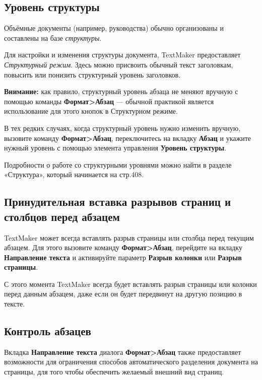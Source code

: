 \documentclass[a4paper,10pt]{article}
\begin{document}
\subsection{Уровень структуры}
Объёмные документы (например, руководства) обычно организованы и составлены на базе \textit{структуры}.

Для настройки и изменения структуры документа, TextMaker предоставляет \textit{Структурный режим}. Здесь можно присвоить обычный текст заголовкам, повысить или понизить структурный уровень заголовков.

\begin{mdframed}[backgroundcolor=blue!10]
\textbf{Внимание:} как правило, структурный уровень абзаца не меняют вручную с помощью команды \textbf{Формат>Абзац} --- обычной практикой является использование для этого кнопок в Структурном режиме.
\end{mdframed}

В тех редких случаях, когда структурный уровень нужно изменить вручную, вызовите команду \textbf{Формат>Абзац}, переключитесь на вкладку \textbf{Абзац} и укажите нужный уровень с помощью элемента управления \textbf{Уровень структуры}.

Подробности о работе со структурными уровнями можно найти в разделе «Структура», который начинается на стр.408.

\subsection{Принудительная вставка разрывов страниц и столбцов перед абзацем}
TextMaker может всегда вставлять разрыв страницы или столбца перед текущим абзацем. Для этого вызовите команду \textbf{Формат>Абзац}, перейдите на вкладку  \textbf{Направление текста} и активируйте параметр \textbf{Разрыв колонки} или \textbf{Разрыв страницы}.

С этого момента TextMaker всегда будет вставлять разрыв страницы или колонки перед данным абзацем, даже если он будет передвинут на другую позицию в тексте.

\subsection{Контроль абзацев}
Вкладка \textbf{Направление текста} диалога \textbf{Формат>Абзац} также предоставляет возможности для ограничения способов автоматического разделения документа на страницы, для того чтобы обеспечить желаемый внешний вид страниц.
\end{document}

